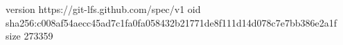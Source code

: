 version https://git-lfs.github.com/spec/v1
oid sha256:c008af54aecc45ad7c1fa0fa058432b21771de8f111d14d078c7e7bb386e2a1f
size 273359
